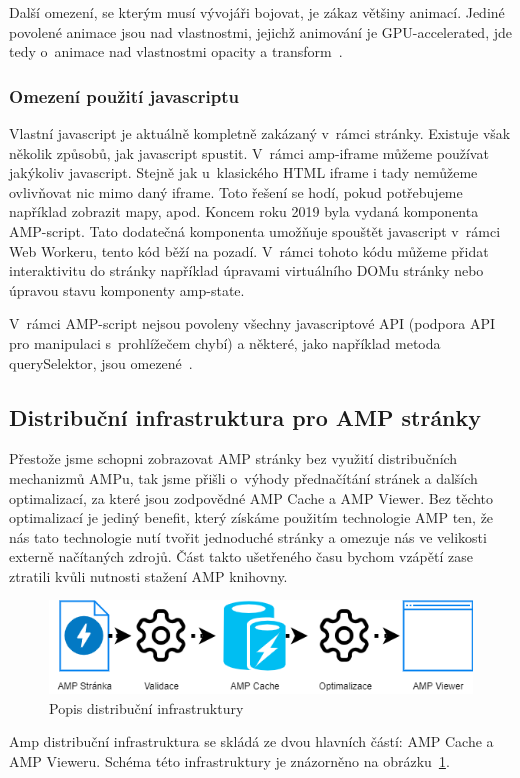 Další omezení, se kterým musí vývojáři bojovat, je zákaz většiny animací. Jediné povolené animace jsou nad vlastnostmi, jejichž animování je GPU-accelerated, jde tedy o~animace nad vlastnostmi opacity a transform~\cite{AMPCss}.

\subsubsection*{Omezení použití javascriptu}
Vlastní javascript je aktuálně kompletně zakázaný v~rámci stránky. Existuje však několik způsobů, jak javascript spustit.
V~rámci amp-iframe můžeme používat jakýkoliv javascript. Stejně jak u~klasického HTML iframe i tady nemůžeme ovlivňovat nic mimo daný iframe. Toto řešení se hodí, pokud potřebujeme například zobrazit mapy, apod.
Koncem roku 2019 byla vydaná komponenta AMP-script. Tato dodatečná komponenta umožňuje spouštět javascript v~rámci Web Workeru, tento kód běží na pozadí. V~rámci tohoto kódu můžeme přidat interaktivitu do stránky například úpravami virtuálního DOMu stránky nebo úpravou stavu komponenty amp-state.

V~rámci AMP-script nejsou povoleny všechny javascriptové API (podpora API pro manipulaci s~prohlížečem chybí) a některé, jako například metoda querySelektor, jsou omezené~\cite{amp-script}.

\subsection*{Distribuční infrastruktura pro AMP stránky}
\label{AmpInfra}
Přestože jsme schopni zobrazovat AMP stránky bez využití distribučních mechanizmů AMPu, tak jsme přišli o~výhody přednačítání stránek a dalších optimalizací, za které jsou zodpovědné AMP Cache a AMP Viewer.
Bez těchto optimalizací je jediný benefit, který získáme použitím technologie AMP ten, že nás tato technologie nutí tvořit jednoduché stránky a omezuje nás ve velikosti externě načítaných zdrojů. Část takto ušetřeného času bychom vzápětí zase ztratili kvůli nutnosti stažení AMP knihovny.

\begin{figure}[hbt]
	\centering
	\includegraphics[width=1\textwidth]{obrazky-figures/AmpDistribuce.png}
	\caption{Popis distribuční infrastruktury}
	\label{Popis Distribuční infrastruktury AMP}
\end{figure}
Amp distribuční infrastruktura se skládá ze dvou hlavních částí: AMP Cache a AMP Vieweru. Schéma této infrastruktury je znázorněno na obrázku~\ref{Popis Distribuční infrastruktury AMP}.

